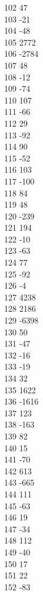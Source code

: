 { 102	47 \\
 103	-21 \\
 104	-48 \\
 105	2772 \\
 106	-2784 \\
 107	48 \\
 108	-12 \\
 109	-74 \\
 110	107 \\
 111	-66 \\
 112	29 \\
 113	-92 \\
 114	90 \\
 115	-52 \\
 116	103 \\
 117	-100 \\
 118	84 \\
 119	48 \\
 120	-239 \\
 121	194 \\
 122	-10 \\
 123	-63 \\
 124	77 \\
 125	-92 \\
 126	-4 \\
 127	4238 \\
 128	2186 \\
 129	-6398 \\
 130	50 \\
 131	-47 \\
 132	-16 \\
 133	-19 \\
 134	32 \\
 135	1622 \\
 136	-1616 \\
 137	123 \\
 138	-163 \\
 139	82 \\
 140	15 \\
 141	-70 \\
 142	613 \\
 143	-665 \\
 144	111 \\
 145	-63 \\
 146	19 \\
 147	-34 \\
 148	112 \\
 149	-40 \\
 150	17 \\
 151	22 \\
 152	-83 \\
}
